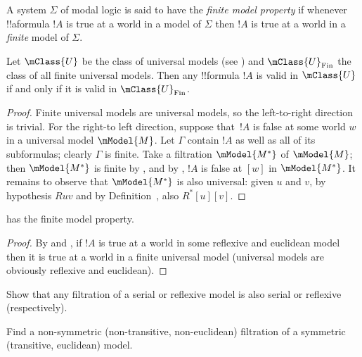 \documentclass[../../../include/open-logic-section]{subfiles}
\begin{document}


\begin{defn}
  A system $\Sigma$ of modal logic is said to have the \emph{finite
    model property} if whenever !!a{formula} $!A$ is true at a world
  in a model of $\Sigma$ then $!A$ is true at a world in a
  \emph{finite} model of $\Sigma$. 
\end{defn}

\begin{prop}
  Let $\mClass{U}$ be the class of universal models (see
  ) and $\mClass{U}_\mathrm{Fin}$ the
  class of all finite universal models. Then any !!{formula} $!A$ is
  valid in $\mClass{U}$ if and only if it is valid in
  $\mClass{U}_\mathrm{Fin}$.
\end{prop}

\begin{proof}
  Finite universal models are universal models, so the left-to-right
  direction is trivial. For the right-to left direction, suppose
  that~$!A$ is false at some world $w$ in a universal model
  $\mModel{M}$. Let $\Gamma$ contain $!A$ as well as all of its
  subformulas; clearly $\Gamma$ is finite. Take a filtration
  $\mModel{M^*}$ of $\mModel{M}$; then $\mModel{M^*}$ is finite by
  , and by
  , $!A$ is false at $[w]$ in
  $\mModel{M^*}$. It remains to observe that $\mModel{M^*}$ is also
  universal: given $u$ and $v$, by hypothesis $Ruv$ and by
  Definition~,
  also $R^*[u][v]$.
\end{proof}

\begin{cor}
   has the finite model property.
\end{cor}

\begin{proof}
  By  and
  , if $!A$ is true at a world in some reflexive
  and euclidean model then it is true at a world in a finite universal
  model (universal models are obviously reflexive and euclidean).
\end{proof}

\begin{prob}
  Show that any filtration of a serial or reflexive model is also
  serial or reflexive (respectively).
\end{prob}

\begin{prob}
  Find a non-symmetric (non-transitive, non-euclidean) filtration of a
  symmetric (transitive, euclidean) model.
\end{prob}
\end{document}
